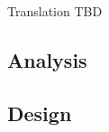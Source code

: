 \documentclass[../main.tex]{subfiles}
\begin{document}
Translation TBD

\subsection{Analysis}


\subsection{Design}

\end{document}
